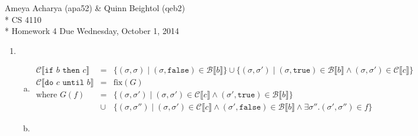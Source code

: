 \documentclass[10pt, oneside]{article}
\begin{document}
\noindent Ameya Acharya (apa52) \& Quinn Beightol (qeb2) \\*
\noindent CS 4110 \\*
\noindent Homework 4
\noindent Due Wednesday, October 1, 2014

\begin{enumerate}[1.]
  \item
  \begin{enumerate}[(a)] 
    \item 
    \begin{eqnarray*}
      \mathcal{C}\llbracket \texttt{if } b \texttt{ then } c \rrbracket & = & 
        \{ (\sigma, \sigma) \mid (\sigma, \texttt{false}) \in \mathcal{B}
                                                          \llbracket b \rrbracket \}
        \cup \{ (\sigma, \sigma') \mid (\sigma, \texttt{true}) \in \mathcal{B}
          \llbracket b \rrbracket \wedge (\sigma, \sigma') \in \mathcal{C}
                                                       \llbracket c \rrbracket \}\\
      \mathcal{C} \llbracket \texttt{do } c \texttt{ until } b  \rrbracket 
        & = & \text{fix}(G)\\
      \text{where } G(f) & = &
  				\{ (\sigma, \sigma') \mid (\sigma, \sigma') \in \mathcal{C} 
				                                              \llbracket c \rrbracket
		 \wedge (\sigma', \texttt{true}) \in \mathcal{B} \llbracket b \rrbracket \} \\
				& \cup & \{ (\sigma, \sigma'') \mid 
				            (\sigma, \sigma')  \in \mathcal{C} \llbracket c \rrbracket 
				     \wedge (\sigma', \texttt{false})\in \mathcal{B} \llbracket b \rrbracket
				     \wedge \exists \sigma''. (\sigma', \sigma'') \in f \}
    \end{eqnarray*}
    
    \item \text{ }
    \begin{prooftree}
    \end{prooftree}
    
    \begin{prooftree}
    \end{prooftree}
  \end{enumerate}


\end{enumerate}
\end{document}
